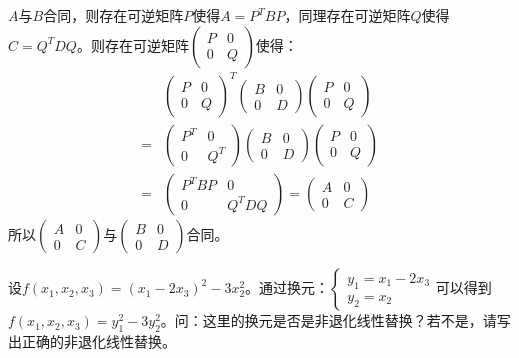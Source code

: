 \documentclass[a4paper]{report}
\begin{document}
\begin{zhengming}
$A$与$B$合同，则存在可逆矩阵$P$使得$A=P^TBP$，同理存在可逆矩阵$Q$使得$C=Q^TDQ$。则存在可逆矩阵$
\begin{pmatrix}
P&0\\
0&Q
\end{pmatrix}
$使得：
\begin{align*}
&\begin{pmatrix}
P&0\\
0&Q
\end{pmatrix}^T\begin{pmatrix}
B&0\\
0&D
\end{pmatrix}\begin{pmatrix}
P&0\\
0&Q
\end{pmatrix}\\=&
\begin{pmatrix}
P^T&0\\
0&Q^T
\end{pmatrix}\begin{pmatrix}
B&0\\
0&D
\end{pmatrix}\begin{pmatrix}
P&0\\
0&Q
\end{pmatrix}\\=&
\begin{pmatrix}
P^TBP&0\\
0&Q^TDQ
\end{pmatrix}=\begin{pmatrix}
A&0\\
0&C
\end{pmatrix}
\end{align*}
所以$
\begin{pmatrix}
A&0\\
0&C
\end{pmatrix}
$与$\begin{pmatrix}
B&0\\
0&D
\end{pmatrix}
$合同。
\end{zhengming}

\EX 设$f(x_1,x_2,x_3)=(x_1-2x_3)^2-3x_2^{2}$。通过换元：$
\begin{cases}
y_1=x_1-2x_3\\y_2=x_2
\end{cases}$可以得到$f(x_1,x_2,x_3)=y_1^2-3y_2^2$。问：这里的换元是否是非退化线性替换？若不是，请写出正确的非退化线性替换。
\end{document}
